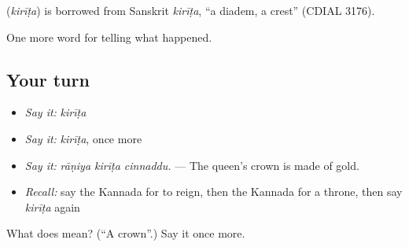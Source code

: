 \begin{cousinweb}
\textbf{} (\emph{kirīṭa}) is borrowed from Sanskrit \emph{kirīṭa}, \textquotedblleft{}a diadem, a crest\textquotedblright{} (CDIAL 3176).
\end{cousinweb}

\begin{grammarlens}[title={What you've built}]
One more word for telling what happened.
\end{grammarlens}

\subsection*{Your turn}
\begin{itemize}
\raggedright
  \item \emph{Say it:} \emph{kirīṭa}
  \item \emph{Say it:} \emph{kirīṭa}, once more
  \item \emph{Say it:} \emph{rāṇiya kirīṭa cinnaddu.} — The queen's crown is made of gold.
  \item \emph{Recall:} say the Kannada for to reign, then the Kannada for a throne, then say \emph{kirīṭa} again
\end{itemize}

\begin{tcolorbox}[breakable,colback=teal!4,colframe=teal!35!black,title={Before you move on}]
What does  mean? (\textquotedblleft{}A crown\textquotedblright{}.) Say it once more.
\end{tcolorbox}
